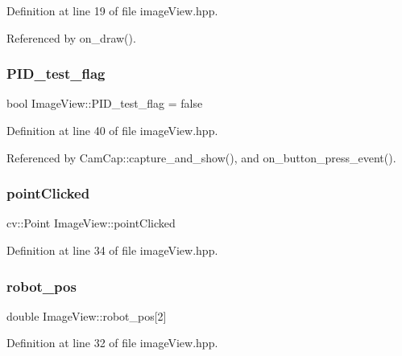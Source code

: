 Definition at line 19 of file image\+View.\+hpp.



Referenced by on\+\_\+draw().

\mbox{\label{class_image_view_ad94a51f7cd15b92c8c9defa5fb745b6d}} 
\subsubsection{\texorpdfstring{P\+I\+D\+\_\+test\+\_\+flag}{PID\_test\_flag}}
{\footnotesize\ttfamily bool Image\+View\+::\+P\+I\+D\+\_\+test\+\_\+flag = false}



Definition at line 40 of file image\+View.\+hpp.



Referenced by Cam\+Cap\+::capture\+\_\+and\+\_\+show(), and on\+\_\+button\+\_\+press\+\_\+event().

\mbox{\label{class_image_view_aaf921d074e2f66a95b190439c19c2a9f}} 
\subsubsection{\texorpdfstring{point\+Clicked}{pointClicked}}
{\footnotesize\ttfamily cv\+::\+Point Image\+View\+::point\+Clicked}



Definition at line 34 of file image\+View.\+hpp.

\mbox{\label{class_image_view_ab97c018602b91e96f318dc92af222aa5}} 
\subsubsection{\texorpdfstring{robot\+\_\+pos}{robot\_pos}}
{\footnotesize\ttfamily double Image\+View\+::robot\+\_\+pos\mbox{[}2\mbox{]}}



Definition at line 32 of file image\+View.\+hpp.



